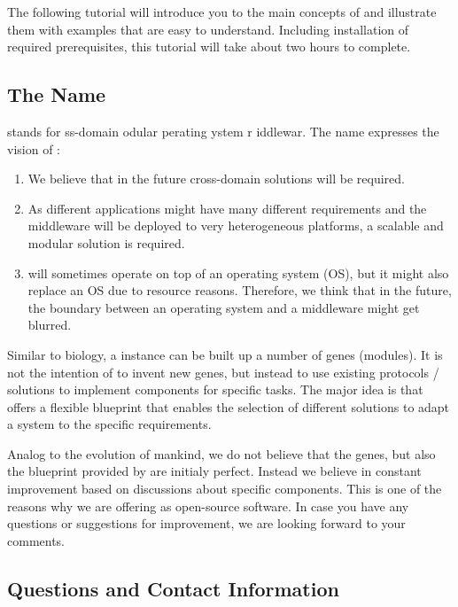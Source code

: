 The following tutorial will introduce you to the main concepts of \xme and illustrate them with examples that are easy to understand.
Including installation of required prerequisites, this tutorial will take about two hours to complete.

\subsection{The Name \xme}
\xme stands for \textbf{}ss-domain \textbf{}odular
\textbf{}perating \textbf{}ystem \textbf{}r
\textbf{}iddlewar\textbf{}.
The name expresses the vision of \xme:
\begin{enumerate}
	\item We believe that in the future cross-domain solutions will be required.
	\item As different applications might have many different requirements
		and the middleware will be deployed to very heterogeneous platforms,
		a scalable and modular solution is required.
	\item \xme will sometimes operate on top of an operating system (OS),
		but it might also replace an OS due to resource reasons.
		Therefore, we think that in the future,
		the boundary between an operating system and a middleware might get blurred.
\end{enumerate}

Similar to biology, a \xme instance can be built up a number of genes (modules).
It is not the intention of \xme to invent new genes, but instead to use
existing protocols / solutions to implement components for specific tasks.
The major idea is that \xme offers a flexible blueprint that enables the
selection of different solutions to adapt a system to the specific requirements.

Analog to the evolution of mankind, we do not believe that the genes,
but also the blueprint provided by \xme are initialy perfect.
Instead we believe in constant improvement based on discussions about specific components.
This is one of the reasons why we are offering \xme as open-source software.
In case you have any questions or suggestions for improvement, we are looking forward to your comments.

\subsection{Questions and Contact Information}

